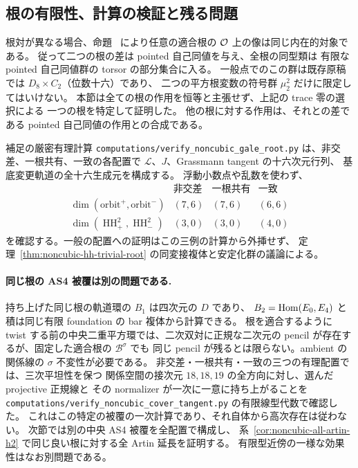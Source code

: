 \subsection{根の有限性、計算の検証と残る問題}

根対が異なる場合、命題~\cite[\texttt{prop:first-orbit-object}]{QuadricIntrinsic2026} により任意の適合根の
$\mathcal O$ 上の像は同じ内在的対象である。
従って二つの根の差は pointed 自己同値を与え、全根の同型類は
有限な pointed 自己同値群の torsor の部分集合に入る。
一般点でのこの群は既存原稿では $D_8\times C_2$（位数十六）であり、
二つの平方根変数の符号群 $\mu_2^2$ だけに限定してはいけない。
本節は全ての根の作用を恒等と主張せず、上記の trace 零の選択による
一つの根を特定して証明した。
他の根に対する作用は、それとの差である pointed 自己同値の作用との合成である。

補足の厳密有理計算
\texttt{computations/verify\_noncubic\_gale\_root.py} は、非交差、一根共有、一致の各配置で
$\mathscr L$、$J$、Grassmann tangent の十六次元行列、
基底変更軌道の全十六生成元を構成する。
浮動小数点や乱数を使わず、
\[
\begin{array}{c|ccc}
 &\text{非交差}&\text{一根共有}&\text{一致}\\\hline
\dim(\text{orbit}^+,\text{orbit}^-)&(7,6)&(7,6)&(6,6)\\
\dim(\operatorname{HH}^2_+,\operatorname{HH}^2_-)&(3,0)&(3,0)&(4,0)
\end{array}
\]
を確認する。一般の配置への証明はこの三例の計算から外挿せず、
定理~\ref{thm:noncubic-hh-trivial-root} の同変接複体と安定化群の議論による。

\paragraph{同じ根の AS4 被覆は別の問題である.}
持ち上げた同じ根の軌道環の $B_1$ は四次元の $D$ であり、
$B_2=\operatorname{Hom}(E_0,E_4)$ と積は同じ有限 foundation の bar 複体から計算できる。
根を適合するように twist する前の中央二重平方環では、二次双対に正規な二次元の
pencil が存在するが、固定した適合根の $\mathcal B^\sigma$ でも
同じ pencil が残るとは限らない。ambient の関係線の $\sigma$ 不変性が必要である。
非交差・一根共有・一致の三つの有理配置では、三次平坦性を保つ
関係空間の接次元 $18,18,19$ の全方向に対し、選んだ projective 正規線と
その normalizer が一次に一意に持ち上がることを
\texttt{computations/verify\_noncubic\_cover\_tangent.py} の有限線型代数で確認した。
これはこの特定の被覆の一次計算であり、それ自体から高次存在は従わない。
次節では別の中央 AS4 被覆を全配置で構成し、
系~\ref{cor:noncubic-all-artin-h2} で同じ良い根に対する全 Artin 延長を証明する。
有限型近傍の一様な効果性はなお別問題である。
